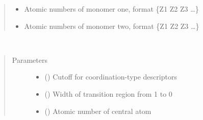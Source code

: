 \documentclass[letterpaper,10pt,english]{sphinxmanual}
\begin{document}
\begin{fulllineitems}
\begin{quote}
\begin{description}
\begin{itemize}
\item {} 
 \textendash{} Atomic numbers of monomer one, format \{Z1 Z2 Z3 …\}

\item {} 
 \textendash{} Atomic numbers of monomer two, format \{Z1 Z2 Z3 …\}

\end{itemize}

\end{description}\end{quote}

\end{fulllineitems}


\begin{fulllineitems}
\label{\detokenize{descriptors:gap.descriptors.coordination}}~\begin{quote}\begin{description}
\item[{Parameters}] \leavevmode\begin{itemize}
\item {} 
 () \textendash{} Cutoff for coordination-type descriptors

\item {} 
 () \textendash{} Width of transition region from 1 to 0

\item {} 
 () \textendash{} Atomic number of central atom

\end{itemize}

\end{description}\end{quote}

\end{fulllineitems}
\end{document}
